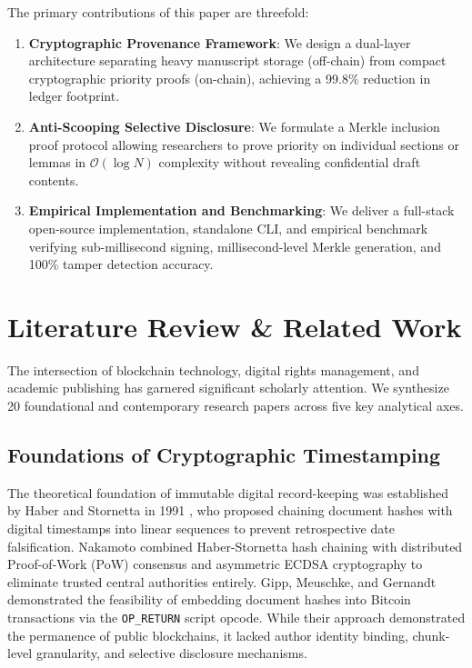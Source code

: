 \documentclass[conference]{IEEEtran}
\begin{document}
The primary contributions of this paper are threefold:
\begin{enumerate}
    \item \textbf{Cryptographic Provenance Framework}: We design a dual-layer architecture separating heavy manuscript storage (off-chain) from compact cryptographic priority proofs (on-chain), achieving a 99.8\% reduction in ledger footprint.
    \item \textbf{Anti-Scooping Selective Disclosure}: We formulate a Merkle inclusion proof protocol allowing researchers to prove priority on individual sections or lemmas in $\mathcal{O}(\log N)$ complexity without revealing confidential draft contents.
    \item \textbf{Empirical Implementation and Benchmarking}: We deliver a full-stack open-source implementation, standalone CLI, and empirical benchmark verifying sub-millisecond signing, millisecond-level Merkle generation, and 100\% tamper detection accuracy.
\end{enumerate}

\section{Literature Review \& Related Work}
The intersection of blockchain technology, digital rights management, and academic publishing has garnered significant scholarly attention. We synthesize 20 foundational and contemporary research papers across five key analytical axes.

\subsection{Foundations of Cryptographic Timestamping}
The theoretical foundation of immutable digital record-keeping was established by Haber and Stornetta in 1991 \cite{haber1991timestamp}, who proposed chaining document hashes with digital timestamps into linear sequences to prevent retrospective date falsification. Nakamoto \cite{nakamoto2008bitcoin} combined Haber-Stornetta hash chaining with distributed Proof-of-Work (PoW) consensus and asymmetric ECDSA cryptography to eliminate trusted central authorities entirely. Gipp, Meuschke, and Gernandt \cite{gipp2015decentralized} demonstrated the feasibility of embedding document hashes into Bitcoin transactions via the \texttt{OP\_RETURN} script opcode. While their approach demonstrated the permanence of public blockchains, it lacked author identity binding, chunk-level granularity, and selective disclosure mechanisms.
\end{document}
